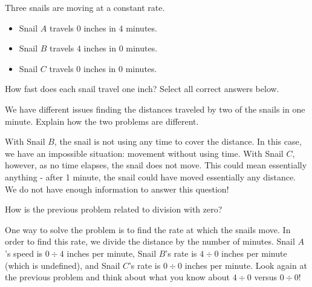\documentclass[nooutcomes]{ximera}
\begin{document}
\begin{problem}
Three snails are moving at a constant rate.

\begin{itemize}
	\item Snail $A$ travels $0$ inches in $4$ minutes.
	\item Snail $B$ travels $4$ inches in $0$ minutes.
	\item Snail $C$ travels $0$ inches in $0$ minutes.
\end{itemize}

How fast does each snail travel one inch?  Select all correct answers below.
\begin{selectAll}
\end{selectAll}

\begin{problem}
We have different issues finding the distances traveled by two of the snails in one minute.  Explain how the two problems are different.
\begin{freeResponse}
	\begin{hint}
	With Snail $B$, the snail is not using any time to cover the distance.  In this case, we have an impossible situation: movement without using time.  With Snail $C$, however, as no time elapses, the snail does not move.  This could mean essentially anything - after 1 minute, the snail could have moved essentially any distance.  We do not have enough information to answer this question!
	\end{hint}
\end{freeResponse}

\begin{problem}
How is the previous problem related to division with zero?
\begin{freeResponse}
	One way to solve the problem is to find the rate at which the snails move.  In order to find this rate, we divide the distance by the number of minutes.  Snail $A$'s speed is $0 \div 4$ inches per minute, Snail $B$'s rate is $4 \div 0$ inches per minute (which is undefined), and Snail $C$'s rate is $0 \div 0$ inches per minute.  Look again at the previous problem and think about what you know about $4 \div 0$ versus $0 \div 0$!
\end{freeResponse}
\end{problem}
\end{problem}
\end{problem}
\end{document}
